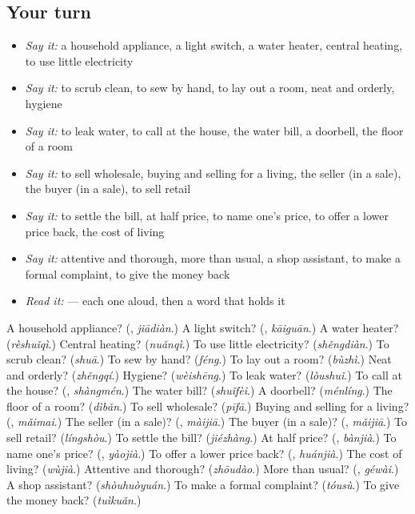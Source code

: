 \subsection*{Your turn}
\begin{itemize}
\raggedright
  \item \emph{Say it:} a household appliance, a light switch, a water heater, central heating, to use little electricity
  \item \emph{Say it:} to scrub clean, to sew by hand, to lay out a room, neat and orderly, hygiene
  \item \emph{Say it:} to leak water, to call at the house, the water bill, a doorbell, the floor of a room
  \item \emph{Say it:} to sell wholesale, buying and selling for a living, the seller (in a sale), the buyer (in a sale), to sell retail
  \item \emph{Say it:} to settle the bill, at half price, to name one's price, to offer a lower price back, the cost of living
  \item \emph{Say it:} attentive and thorough, more than usual, a shop assistant, to make a formal complaint, to give the money back
  \item \emph{Read it:}    — each one aloud, then a word that holds it
\end{itemize}

\begin{tcolorbox}[breakable,colback=teal!4,colframe=teal!35!black,title={Before you move on}]
A household appliance? (\textbf{}, \emph{jiādiàn}.) A light switch? (\textbf{}, \emph{kāiguān}.) A water heater? (\emph{rèshuǐqì}.) Central heating? (\emph{nuǎnqì}.) To use little electricity? (\emph{shěngdiàn}.) To scrub clean? (\emph{shuā}.) To sew by hand? (\emph{féng}.) To lay out a room? (\emph{bùzhì}.) Neat and orderly? (\emph{zhěngqí}.) Hygiene? (\emph{wèishēng}.) To leak water? (\emph{lòushuǐ}.) To call at the house? (\textbf{}, \emph{shàngmén}.) The water bill? (\emph{shuǐfèi}.) A doorbell? (\emph{ménlíng}.) The floor of a room? (\emph{dìbǎn}.) To sell wholesale? (\emph{pīfā}.) Buying and selling for a living? (\textbf{}, \emph{mǎimai}.) The seller (in a sale)? (\textbf{}, \emph{màijiā}.) The buyer (in a sale)? (\textbf{}, \emph{mǎijiā}.) To sell retail? (\emph{língshòu}.) To settle the bill? (\emph{jiézhàng}.) At half price? (\textbf{}, \emph{bànjià}.) To name one's price? (\textbf{}, \emph{yàojià}.) To offer a lower price back? (\textbf{}, \emph{huánjià}.) The cost of living? (\emph{wùjià}.) Attentive and thorough? (\emph{zhōudào}.) More than usual? (\textbf{}, \emph{géwài}.) A shop assistant? (\emph{shòuhuòyuán}.) To make a formal complaint? (\emph{tóusù}.) To give the money back? (\emph{tuìkuǎn}.)
\end{tcolorbox}
